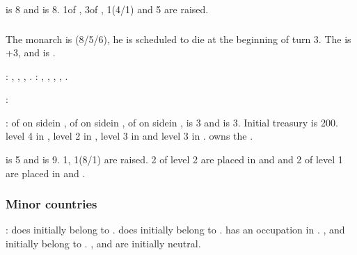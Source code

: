 \aparag {} is 8 and  is
8. 1\ARMY\facemoins of \Janissaire, 3\ARMY\faceplus of \Timar,
1\FLEET\facemoins (4\NGD/1\NTD) and 5 \Pashas are raised.


\subsubsection{\paysmajeurVenise}
\aparag The monarch is \monarqueBarbarigo (8/5/6), he is scheduled to die at
the beginning of turn 3. The \STAB is +3, and \VEN is .

: \provinceVeneto, \provinceMantova,
\provinceFriuli, \provinceIstria.
: \provinceDalmacija, \provinceCorfu, \provinceKreta,
\provinceCyclades, \provinceChypre.

:
\begin{modlist}
\item[\SUB] \paysmamelouks
\end{modlist}

:
\bparag \MNU of  on side\faceplus in \provinceVeneto, \MNU of
 on side\facemoins in \provinceVeneto, \MNU of  on
side\facemoins in \provinceChypre, \FTI is 3 and \DTI is 3.
\bparag Initial treasury is 200\ducats.
\bparag \TradeFLEET level 4 in , level 2 in , level 3
in  and level 3 in . \VEN owns the
.

\aparag {} is 5 and  is
9. 1\ARMY\facemoins, 1\FLEET\faceplus (8\NGD/1\NTD) are raised. 2 \Presidios
of level 2 are placed in \provinceMoreas and \provinceAlabania and 2 of level
1 are placed in \provinceHellas and \provinceMontenegro.


\subsubsection{Minor countries}
\aparag[Provinces]:
\bparag \provinceTrentino does initially belong to \paysHabsbourg.
\bparag \provinceBresse does initially belong to \paysSavoie.
\bparag[] [BLP] \paysSavoie has an occupation in \provinceDauphine.
\bparag \provinceGotland, \provinceVastergotland and \provinceSkane initially
belong to \paysdanemark.
\bparag \provinceMontenegro, \provinceSerbia and \provinceBosna are initially
neutral.

